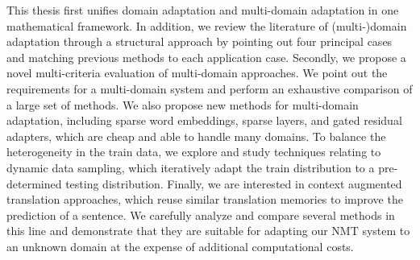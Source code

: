 \begin{mdframed}[linecolor=Prune,linewidth=1]
\begin{multicols}{2}
This thesis first unifies domain adaptation and multi-domain adaptation in one mathematical framework. In addition, we review the literature of (multi-)domain adaptation through a structural approach by pointing out four principal cases and matching previous methods to each application case. Secondly, we propose a novel multi-criteria evaluation of multi-domain approaches. We point out the requirements for a multi-domain system and perform an exhaustive comparison of a large set of methods. We also propose new methods for multi-domain adaptation, including sparse word embeddings, sparse layers, and gated residual adapters, which are cheap and able to handle many domains. To balance the heterogeneity in the train data, we explore and study techniques relating to dynamic data sampling, which iteratively adapt the train distribution to a pre-determined testing distribution. Finally, we are interested in context augmented translation approaches, which reuse similar translation memories to improve the prediction of a sentence. We carefully analyze and compare several methods in this line and demonstrate that they are suitable for adapting our NMT system to an unknown domain at the expense of additional computational costs.
\end{multicols}
\end{mdframed}